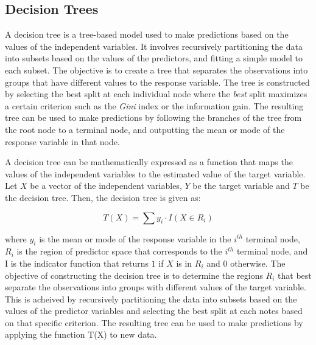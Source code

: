 \documentclass{article}[12pt]
\theoremstyle{definition}
\begin{document}
\bigskip

\subsection{Decision Trees}

\bigskip

A decision tree is a tree-based model used to make predictions based on the values of the independent variables. It involves recursively partitioning the data into subsets based on the values of the predictors, and fitting a simple model to each subset. The objective is to create a tree that separates the observations into groups that have different values to the response variable. The tree is constructed by selecting the best split at each individual node where the \emph{best} split maximizes a certain criterion such as the \emph{Gini} index or the information gain. The resulting tree can be used to make predictions by following the branches of the tree from the root node to a terminal node, and outputting the mean or mode of the response variable in that node.

\newpage

\bigskip

\noindent
A decision tree can be mathematically expressed as a function that maps the values of the independent variables to the estimated value of the target variable. Let $X$ be a vector of the independent variables, $Y$ be the target variable and $T$ be the decision tree. Then, the decision tree is given as:

\medskip

$$ T(X) = \sum y_i \cdot I (X \in {R}_i)$$

\medskip

\noindent
where $y_i$ is the mean or mode of the response variable in the $i^{th}$ terminal node, $R_i$ is the region of predictor space that corresponds to the $i^{th}$ terminal node, and I is the indicator function that returns $1$ if $X$ is in $R_i$ and 0 otherwise. The objective of constructing the decision tree is to determine the regions $R_i$ that best separate the observations into groups with different values of the target variable. This is acheived by recursively partitioning the data into subsets based on the values of the predictor variables and selecting the best split at each notes based on that specific criterion. The resulting tree can be used to make predictions by applying the function T(X) to new data.

\bigskip
\end{document}
